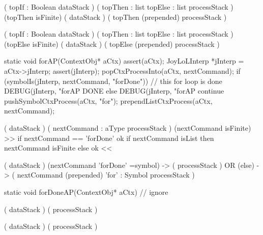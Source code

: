 \preDataStack
  (
    topIf : Boolean
    dataStack
  )
\preProcessStack
  (
    topThen : list
    topElse : list
    processStack
  )
\preConditions
  (topThen isFinite)
\postDataStack
  (
    dataStack
  )
\postProcessStack
  (
    topThen (prepended)
    processStack
  )
\postConditions
\stopRule

\preDataStack
  (
    topIf : Boolean
    dataStack
  )
\preProcessStack
  (
    topThen : list
    topElse : list
    processStack
  )
\preConditions
  (topElse isFinite)
\postDataStack
  (
    dataStack
  )
\postProcessStack
  (
    topElse (prepended)
    processStack
  )
\postConditions
\stopRule

\stopJoyLoLWord

\startCCode
static void forAP(ContextObj* aCtx) {
  assert(aCtx);
  JoyLoLInterp *jInterp = aCtx->jInterp;
  assert(jInterp);
  popCtxProcessInto(aCtx, nextCommand);
  if (symbolIs(jInterp, nextCommand, "forDone")) {
    // this for loop is done
    DEBUG(jInterp, "forAP DONE%
  } else {
    DEBUG(jInterp, "forAP continue%
    pushSymbolCtxProcess(aCtx, "for");
    prependListCtxProcess(aCtx, nextCommand);
  }
}
\stopCCode

\starttyping

\startWord[for]
\preDataStack
  (
    dataStack
  )
\preProcessStack
  (
    nextCommand : aType
    processStack
  )
\preConditions
  (nextCommand isFinite)  >> if nextCommand == 'forDone' ok
                             if nextCommand isList then nextCommand isFinite
                             else ok <<
\stopPreStack

\postDataStack
  (
    dataStack
  )
\postProcessStack
  (nextCommand 'forDone' =symbol) -> (
    processStack
  )
  OR
  (else) -> (
    nextCommand (prepended)
    'for' : Symbol
    processStack
  )
\postConditions
\stopPostStack

\stopWord

\stoptyping

\startCCode
static void forDoneAP(ContextObj* aCtx) {
  // ignore
}
\stopCCode

\starttyping

\startWord[forDone]

\preDataStack
  ( dataStack )
\preProcessStack
  ( processStack )
\preConditions
\stopPreStack

\postDataStack
  ( dataStack )
\postProcessStack
  ( processStack )
\postConditions
\stopPostStack

\stopWord

